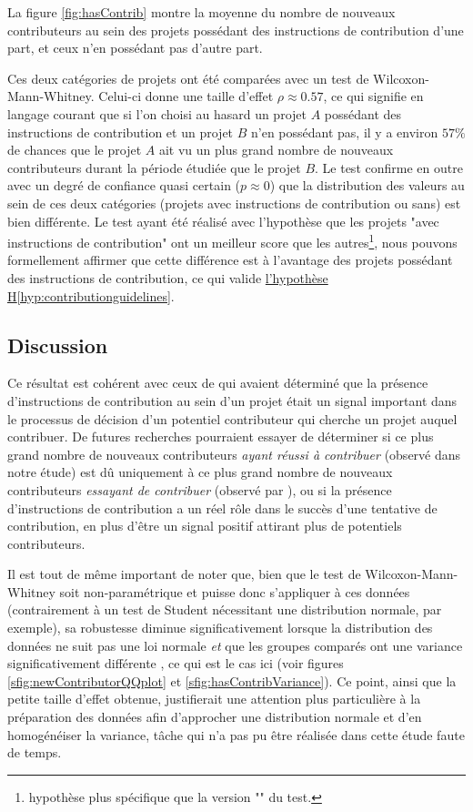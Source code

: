 La figure \ref{fig:hasContrib} montre la moyenne du nombre de nouveaux contributeurs au sein des projets
possédant des instructions de contribution d'une part, et ceux n'en possédant pas d'autre part.

Ces deux catégories de projets ont été comparées avec un test de Wilcoxon-Mann-Whitney. Celui-ci donne une
taille d'effet $ρ \approx 0.57$, ce qui signifie en langage courant que si l'on choisi au hasard un projet $A$
possédant des instructions de contribution et un projet $B$ n'en possédant pas, il y a environ $57\%$ de
chances que le projet $A$ ait vu un plus grand nombre de nouveaux contributeurs durant la période étudiée que
le projet $B$. Le test confirme en outre avec un degré de confiance quasi certain ($p \approx 0$) que la
distribution des valeurs au sein de ces deux catégories (projets avec instructions de contribution ou sans)
est bien différente. Le test ayant été réalisé avec l'hypothèse que les projets "avec instructions de
contribution" ont un meilleur score que les autres\footnote{hypothèse plus spécifique que la version
"" du test.}, nous pouvons formellement affirmer que cette différence est à l'avantage des
projets possédant des instructions de contribution, ce qui valide
\hyperref[hyp:contributionguidelines]{l'hypothèse H\ref*{hyp:contributionguidelines}}.

\subsection{Discussion}

Ce résultat est cohérent avec ceux de \textcite[p.~11]{signals-2019} qui avaient déterminé que la présence
d'instructions de contribution au sein d'un projet était un signal important dans le processus de décision
d'un potentiel contributeur qui cherche un projet auquel contribuer. De futures recherches pourraient essayer
de déterminer si ce plus grand nombre de nouveaux contributeurs \emph{ayant réussi à contribuer} (observé dans
notre étude) est dû uniquement à ce plus grand nombre de nouveaux contributeurs \emph{essayant de contribuer}
(observé par \textcite{signals-2019}), ou si la présence d'instructions de contribution a un réel rôle dans le
succès d'une tentative de contribution, en plus d'être un signal positif attirant plus de potentiels
contributeurs.

Il est tout de même important de noter que, bien que le test de Wilcoxon-Mann-Whitney soit non-paramétrique et
puisse donc s'appliquer à ces données (contrairement à un test de Student nécessitant une distribution
normale, par exemple), sa robustesse diminue significativement lorsque la distribution des données ne suit pas
une loi normale \emph{et} que les groupes comparés ont une variance significativement différente
\parencite{WMW-robustness-1998}, ce qui est le cas ici (voir figures \ref{sfig:newContributorQQplot} et
\ref{sfig:hasContribVariance}). Ce point, ainsi que la petite taille d'effet obtenue, justifierait une
attention plus particulière à la préparation des données afin d'approcher une distribution normale et d'en
homogénéiser la variance, tâche qui n'a pas pu être réalisée dans cette étude faute de temps.

